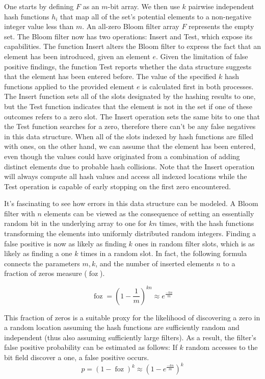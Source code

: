 \documentclass[sigconf]{acmart}
\DeclareMathOperator{\foz}{foz}
\begin{document}
One starts by defining $F$ as an $m$-bit array. We then use $k$ pairwise independent hash functions $h_i$ that map all of the set's potential elements to a non-negative integer value less than $m$. An all-zero Bloom filter array $F$ represents the empty set. The Bloom filter now has two operations: Insert and Test, which expose its capabilities. The function Insert alters the Bloom filter to express the fact that an element has been introduced, given an element $e$. Given the limitation of false positive findings, the function Test reports whether the data structure suggests that the element has been entered before. The value of the specified $k$ hash functions applied to the provided element $e$ is calculated first in both processes. The Insert function sets all of the slots designated by the hashing results to one, but the Test function indicates that the element is not in the set if one of these outcomes refers to a zero slot. The Insert operation sets the same bits to one that the Test function searches for a zero, therefore there can't be any false negatives in this data structure. When all of the slots indexed by hash functions are filled with ones, on the other hand, we can assume that the element has been entered, even though the values could have originated from a combination of adding distinct elements due to probable hash collisions. Note that the Insert operation will always compute all hash values and access all indexed locations while the Test operation is capable of early stopping on the first zero encountered.

It's fascinating to see how errors in this data structure can be modeled. A Bloom filter with $n$ elements can be viewed as the consequence of setting an essentially random bit in the underlying array to one for $kn$ times, with the hash functions transforming the elements into uniformly distributed random integers.
Finding a false positive is now as likely as finding $k$ ones in random filter slots, which is as likely as finding a one $k$ times in a random slot.
In fact, the following formula connects the parameters $m, k$, and the number of inserted elements $n$ to a fraction of zeros measure ($\foz$).

\begin{equation}
  \foz = \left(1- \frac{1}{m} \right) ^{k n} \approx e^{\frac{-k n}{m}}
\end{equation}

This fraction of zeros is a suitable proxy for the likelihood of discovering a zero in a random location assuming the hash functions are sufficiently random and independent (thus also assuming sufficiently large filters). As a result, the filter's false positive probability can be estimated as follows: If $k$ random accesses to the bit field discover a one, a false positive occurs.
\begin{equation}
  p = (1-\foz)^k \approx \left(1-  e^{\frac{-k n}{m}} \right)^k
\end{equation}
\end{document}
